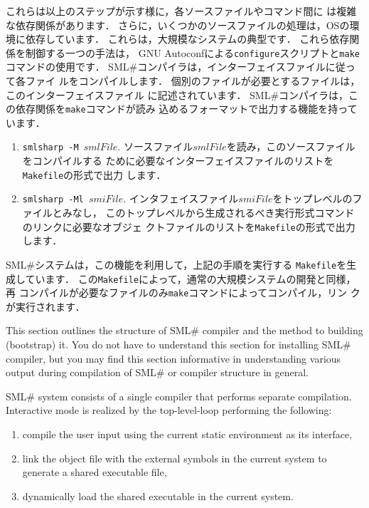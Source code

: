 \documentclass{jbook}
\newcommand{\smlsharp}{SML\#}
\begin{document}
	これらは以上のステップが示す様に，各ソースファイルやコマンド間に
は複雑な依存関係があります．
	さらに，いくつかのソースファイルの処理は，OSの環境に依存しています．
	これらは，大規模なシステムの典型です．
	これら依存関係を制御する一つの手法は，%
GNU Autoconfによる{\tt configure}スクリプトと{\tt make}コマンドの使用です．
	\smlsharp{}コンパイラは，インターフェイスファイルに従って各ファイ
ルをコンパイルします．
	個別のファイルが必要とするファイルは，このインターフェイスファイル
に記述されています．
	\smlsharp{}コンパイラは，この依存関係を{\tt make}コマンドが読み
込めるフォーマットで出力する機能を持っています．
\begin{enumerate}
\item {\tt smlsharp -M $smlFile$}.
	ソースファイル$smlFile$を読み，このソースファイルをコンパイルする
ために必要なインターフェイスファイルのリストを{\tt Makefile}の形式で出力
します．
\item {\tt smlsharp -Ml $smiFile$}.
	インタフェイスファイル$smiFile$をトップレベルのファイルとみなし，
このトップレベルから生成されるべき実行形式コマンドのリンクに必要なオブジェ
クトファイルのリストを{\tt Makefile}の形式で出力します．
\end{enumerate}	

	\smlsharp{}システムは，この機能を利用して，上記の手順を実行する
{\tt Makefile}を生成しています．
	この{\tt Makefile}によって，通常の大規模システムの開発と同様，再
コンパイルが必要なファイルのみ{\tt make}コマンドによってコンパイル，リン
クが実行されます．

\else%

	This section outlines the structure of \smlsharp{} compiler and
the method to building (bootstrap) it.
	You do not have to understand this section for installing
\smlsharp{} compiler, but you may find this section informative in
understanding various output during compilation of \smlsharp{} or 
compiler structure in general.

	\smlsharp{} system consists of a single compiler that performs
separate compilation. 
	Interactive mode is realized by the top-level-loop performing
the following:
\begin{enumerate}
\item compile the user input using the current static environment as its
interface,
\item link the object file with the external symbols in the current
system to generate a shared executable file,
\item dynamically load the shared executable in the current system.
\end{enumerate}
\end{document}
